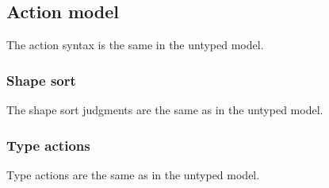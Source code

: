 \documentclass[formalism.tex]{subfiles}
\begin{document}
\subsection{Action model}
\label{sec:typed-action-model}
The action syntax is the same in the untyped model.

\subsubsection{Shape sort}
\label{sec:typed-shape-sort}
The shape sort judgments are the same as in the untyped model.

\subsubsection{Type actions}
\label{sec:typed-type-actions}
Type actions are the same as in the untyped model.
\end{document}
